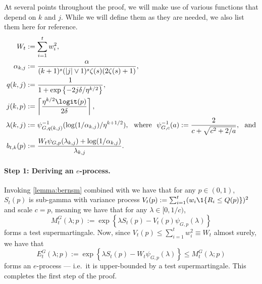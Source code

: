 At several points throughout the proof, we will make use of various functions that depend on $k$ and $j$. While we will define them as they are needed, we also list them here for reference.
\begin{subequations}
  \begin{align}
    W_t &:= \sum_{i=1}^t w_i^2, \label{eq:W_t}\\
    \alpha_{k,j} &:= \frac{\alpha}{(k+1)^s (|j| \lor 1)^s \zeta(s) (2\zeta(s) + 1)},\label{eq:alpha_kj}\\
    q(k,j) &:= \frac{1}{1+\exp \left \{ -2j\delta / \eta^{k/2} \right \}}, \label{eq:q_kj}\\
    j(k,p) &:= \left \lceil \frac{\eta^{k/2} \logit(p) }{2\delta} \right \rceil, \\
    \lambda(k,j) &:= \psi^{-1}_{G, q(k,j)}( \log(1/\alpha_{k,j}) / \eta^{k+1/2}),~~\text{where}~~\psi_{G,c}^{-1}(a) := \frac{2}{c + \sqrt{c^2 + 2/a}}, ~~\text{and}\label{eq:lambda_kj}\\
    b_{t,k}(p) &:= \frac{W_t \psi_{G, p} (\lambda_{k,j}) + \log(1/\alpha_{k,j})}{\lambda_{k,j}}.
  \end{align}
  \end{subequations}

    \paragraph{Step 1: Deriving an $e$-process.}
    Invoking \cref{lemma:bernsm} combined with \citet[Table 5, row 7]{howard_exponential_2018} we have that for any $p \in (0, 1)$, $S_t(p)$ is sub-gamma \citep{howard_exponential_2018,howard2018uniform} with variance process $V_t(p) := \sum_{i=1}^t ( w_i \1\{ R_i \leq Q(p)\} )^2$ and scale $c = p$, meaning we have that for any $\lambda \in [0, 1/c)$,
    \begin{equation}
      M_t^G(\lambda; p) := \exp\left \{ \lambda S_t(p) - V_t(p) \psi_{G, p}(\lambda) \right \}
    \end{equation}
    forms a test supermartingale.
    Now, since $V_t(p) \leq \sum_{i=1}^t w_i^2 \equiv W_t$ almost surely, we have that
    \begin{equation}
      E_t^G(\lambda; p) := \exp \left \{ \lambda S_t(p) - W_t \psi_{G,p}(\lambda) \right \} \leq M_t^G( \lambda; p)
    \end{equation}
    forms an $e$-process --- i.e.~it is upper-bounded by a test supermartingale.
    This completes the first step of the proof.

